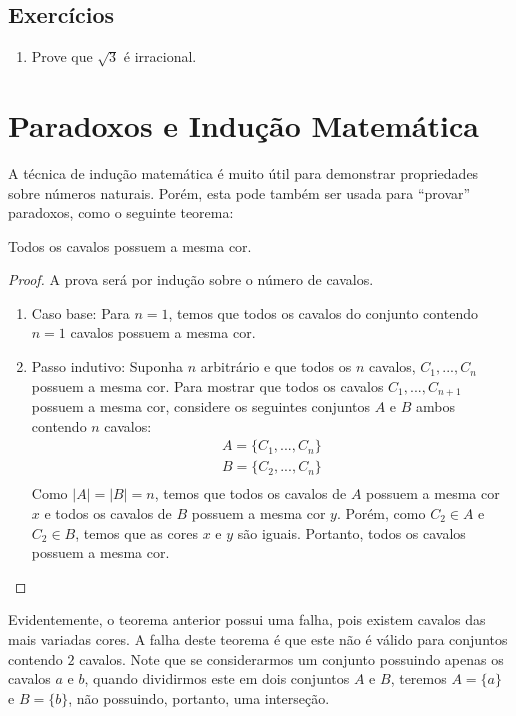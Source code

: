\subsection{Exercícios}

\begin{enumerate}
  \item Prove que $\sqrt{3}$ é irracional.
\end{enumerate}

\section{Paradoxos e Indução Matemática}

A técnica de indução matemática é muito útil para demonstrar
propriedades sobre números naturais. Porém, esta pode também ser usada
para ``provar'' paradoxos, como o seguinte teorema:
\begin{Theorem}
Todos os cavalos possuem a mesma cor.
\end{Theorem}
\begin{proof}
A prova será por indução sobre o número de cavalos.
\begin{enumerate}
  \item[\ ]Caso base: Para $n = 1$, temos que todos os cavalos do
    conjunto contendo $ n = 1$ cavalos possuem a mesma cor.
  \item[\ ]Passo indutivo: Suponha $n$ arbitrário e que todos os $n$
    cavalos, $C_1,...,C_n$ possuem a mesma cor. Para mostrar que todos
    os cavalos $C_1,...,C_{n+1}$ possuem a mesma cor, considere os
    seguintes conjuntos $A$ e $B$ ambos contendo $n$ cavalos:
    \[
    \begin{array}{l}
      A = \{C_1,...,C_n\} \\
      B = \{C_2,...,C_n\}\\
    \end{array}
    \]
    Como  $|A| = |B| = n$, temos que todos os cavalos de $A$ possuem a
    mesma cor $x$ e todos os cavalos de $B$ possuem a mesma cor
    $y$. Porém, como $C_2 \in A$ e $C_2 \in B$, temos que as cores $x$
    e $y$ são iguais. Portanto, todos os cavalos possuem a mesma cor.
\end{enumerate}
\end{proof}
Evidentemente, o teorema anterior possui uma falha, pois existem
cavalos das mais variadas cores. A falha deste teorema é que este não
é válido para conjuntos contendo $2$ cavalos. Note que se
considerarmos um conjunto possuindo apenas os cavalos $a$ e $b$,
quando dividirmos este em dois conjuntos $A$ e $B$, teremos $A =\{a\}$
e $B =\{b\}$, não possuindo, portanto, uma interseção.

